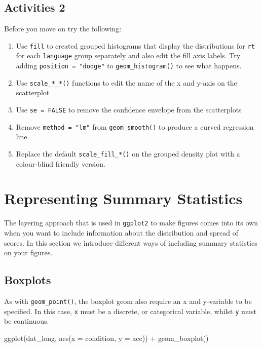 \documentclass[
  english,
  doc,floatsintext]{apa6}
\newenvironment{Shaded}{\begin{snugshade}}{\end{snugshade}}
\newcommand{\AttributeTok}[1]{\textcolor[rgb]{0.77,0.63,0.00}{#1}}
\newcommand{\FunctionTok}[1]{\textcolor[rgb]{0.00,0.00,0.00}{#1}}
\newcommand{\NormalTok}[1]{#1}
\newcommand{\SpecialCharTok}[1]{\textcolor[rgb]{0.00,0.00,0.00}{#1}}
\begin{document}
\hypertarget{activities-2}{%
\subsection{Activities 2}\label{activities-2}}

Before you move on try the following:

\begin{enumerate}
\def\labelenumi{\arabic{enumi}.}
\item
  Use \texttt{fill} to created grouped histograms that display the distributions for \texttt{rt} for each \texttt{language} group separately and also edit the fill axis labels. Try adding \texttt{position\ =\ "dodge"} to \texttt{geom\_histogram()} to see what happens.
\item
  Use \texttt{scale\_*\_*()} functions to edit the name of the x and y-axis on the scatterplot
\item
  Use \texttt{se\ =\ FALSE} to remove the confidence envelope from the scatterplots
\item
  Remove \texttt{method\ =\ "lm"} from \texttt{geom\_smooth()} to produce a curved regression line.
\item
  Replace the default \texttt{scale\_fill\_*()} on the grouped density plot with a colour-blind friendly version.
\end{enumerate}

\hypertarget{representing-summary-statistics}{%
\section{Representing Summary Statistics}\label{representing-summary-statistics}}

The layering approach that is used in \texttt{ggplot2} to make figures comes into its own when you want to include information about the distribution and spread of scores. In this section we introduce different ways of including summary statistics on your figures.

\hypertarget{boxplots}{%
\subsection{Boxplots}\label{boxplots}}

As with \texttt{geom\_point()}, the boxplot geom also require an x and y-variable to be specified. In this case, \texttt{x} must be a discrete, or categorical variable, whilst \texttt{y} must be continuous.

\begin{Shaded}
\begin{Highlighting}[]
\FunctionTok{ggplot}\NormalTok{(dat\_long, }\FunctionTok{aes}\NormalTok{(}\AttributeTok{x =}\NormalTok{ condition, }\AttributeTok{y =}\NormalTok{ acc)) }\SpecialCharTok{+}
  \FunctionTok{geom\_boxplot}\NormalTok{()}
\end{Highlighting}
\end{Shaded}
\end{document}
